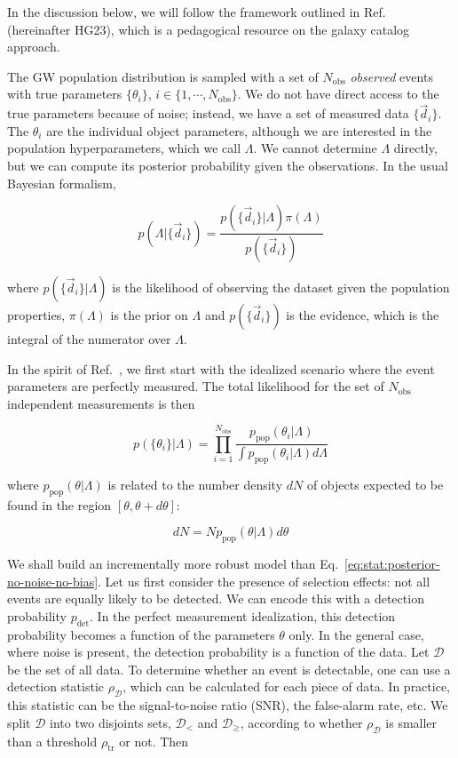 \documentclass[%
preprint,
nofootinbib,
 amsmath,amssymb,
 aps,
]{revtex4-2}
\newcommand{\given}[2]{p( #1 | #2 )}
\newcommand{\ppop}[0]{p_{\text{pop}}}
\newcommand{\pdet}[0]{p_{\text{det}}}
\newcommand{\nobs}[0]{N_{\text{obs}}}
\begin{document}
In the discussion below, we will follow the framework outlined in Ref.~
(hereinafter HG23), which is a pedagogical resource on the galaxy catalog approach.

The GW population distribution is sampled with a set of $\nobs$ \textit{observed} events with true
parameters $\{ \theta_i \}$, $i \in \{1, \cdots, \nobs\}$. We do not have direct access to the true
parameters because of noise; instead, we have a set of measured data $\{ \vec{d}_i \}$. The
$\theta_i$ are the individual object parameters, although we are interested in the population
hyperparameters, which we call $\Lambda$. We cannot determine $\Lambda$ directly, but we can
compute its posterior probability given the observations. In the usual Bayesian formalism,

\begin{equation}
	\given{\Lambda}{\{\vec{d}_i \}} =
	\frac{\given{\{\vec{d}_i \}}{\Lambda} \pi(\Lambda)}{p(\{\vec{d}_i \})}
\end{equation}

where $\given{\{\vec{d}_i \}}{\Lambda}$ is the likelihood of observing the dataset given the
population properties, $\pi(\Lambda)$ is the prior on $\Lambda$ and $p(\{\vec{d}_i \})$ is the
evidence, which is the integral of the numerator over $\Lambda$.

In the spirit of Ref.~, we first start with the idealized scenario where
the event parameters are perfectly measured. The total likelihood for the set of $\nobs$
independent measurements is then

\begin{equation}
	\label{eq:stat:posterior-no-noise-no-bias}
	\given{\{ \theta_i \}}{\Lambda} =
	\prod_{i=1}^{\nobs} \frac{\ppop(\theta_i | \Lambda)}{\int \ppop(\theta_i | \Lambda) d\Lambda}
\end{equation}

where $\ppop(\theta | \Lambda)$ is related to the number density $dN$ of objects expected to be
found in the region $[\theta, \theta + d\theta]$:

\begin{equation}
	\label{eq:stat:ppop}
	dN = N \ppop(\theta | \Lambda) d\theta
\end{equation}

We shall build an incrementally more robust model than
Eq.~\eqref{eq:stat:posterior-no-noise-no-bias}. Let us first consider the presence of selection
effects: not all events are equally likely to be detected. We can encode this with a detection
probability $\pdet$. In the perfect measurement idealization, this detection probability becomes a
function of the parameters $\theta$ only. In the general case, where noise is present, the
detection probability is a function of the data. Let $\mathcal{D}$ be the set of all data. To
determine whether an event is detectable, one can use a detection statistic $\rho_{\mathcal{D}}$,
which can be calculated for each piece of data. In practice, this statistic can be the
signal-to-noise ratio (SNR), the false-alarm rate, etc. We split $\mathcal{D}$ into two disjoints
sets, $\mathcal{D}_<$ and $\mathcal{D}_\geq$, according to whether $\rho_\mathcal{D}$ is smaller
than a threshold $\rho_{\text{tr}}$ or not. Then
\end{document}
